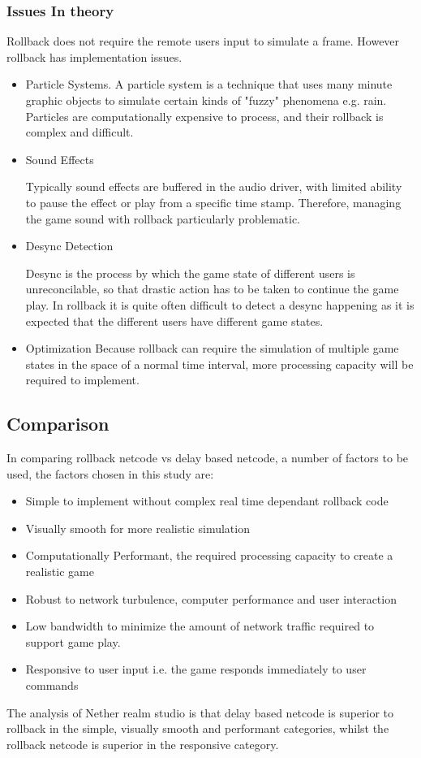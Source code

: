 \documentclass{entcs}
\begin{document}
\subsubsection{Issues In theory}
Rollback does not require the remote users input to simulate a frame. However rollback has implementation issues.
\begin{itemize}
\item Particle Systems.
A particle system is a technique that uses many minute graphic objects to simulate certain kinds of "fuzzy" phenomena e.g. rain. Particles are computationally expensive to process, and their rollback is complex and difficult.

\item Sound Effects

Typically sound effects are buffered in the audio driver, with limited ability to pause the effect or play from a specific time stamp. Therefore, managing the game sound with rollback particularly problematic.

\item Desync Detection

Desync is the process by which the game state of different users is unreconcilable, so that drastic action has to be taken to continue the game play.  In rollback it is quite often difficult to detect a desync happening as it is expected that the different users have different game states.
\item Optimization
Because rollback can require the simulation of multiple game states in the space of a normal time interval, more processing capacity will be required to implement.
\end{itemize}
\subsection{Comparison}
In comparing rollback netcode vs delay based netcode, a number of factors to be used, the factors chosen in this study are:
\begin{itemize}
\item Simple to implement without complex real time dependant rollback code
\item Visually smooth for more realistic simulation
\item Computationally Performant, the required processing capacity to create a realistic game
\item Robust to network turbulence, computer performance and user interaction
\item Low bandwidth to minimize the amount of network traffic required to support game play.
\item Responsive to user input i.e. the game responds immediately to user commands
\end{itemize}
The analysis of Nether realm studio \cite{8Frames} is that delay based netcode is superior to rollback in the simple, visually smooth and performant categories, whilst the rollback netcode is superior in the responsive category.
\end{document}
